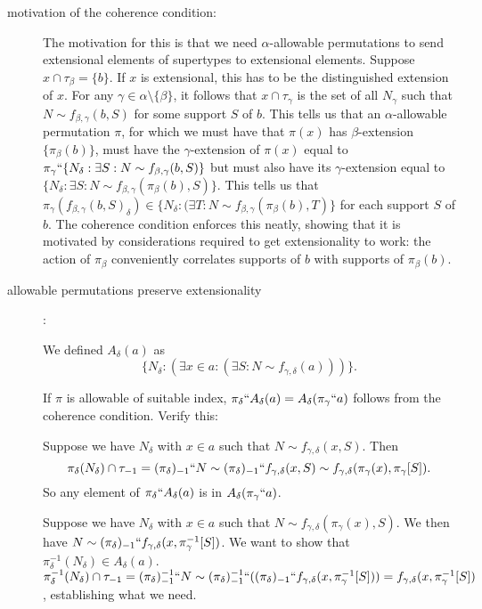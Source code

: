 \documentclass[112pt]{article}
\begin{document}
\begin{description}
\item[motivation of the coherence condition:]  The motivation for this is that we need $\alpha$-allowable permutations to send extensional elements of supertypes to extensional elements.  Suppose
$x \cap \tau_\beta = \{b\}$.  If $x$ is extensional, this has to be the distinguished extension of $x$.  For any $\gamma \in \alpha \setminus \{\beta\}$,
it follows that $x \cap \tau_\gamma$ is the set of all $N_\gamma$ such that $N \sim f_{\beta,\gamma}(b,S)$ for some support $S$ of $b$.  This tells us that an $\alpha$-allowable permutation $\pi$, for which we must have that $\pi(x)$ has $\beta$-extension $\{\pi_\beta(b)\}$, must have the  $\gamma$-extension of $\pi(x)$ equal to $\pi_\gamma``\{N_\delta:\exists S:N \sim f_{\beta,\gamma}(b,S)\}$
but must also have its $\gamma$-extension equal to $\{N_\delta:\exists S:N \sim f_{\beta,\gamma}(\pi_\beta(b),S)\}$.  This tells us that $\pi_\gamma(f_{\beta,\gamma}(b,S)_\delta) \in \{N_\delta:(\exists T:N \sim f_{\beta,\gamma}(\pi_\beta(b),T)\}$ for each support $S$ of $b$.  The coherence condition enforces this neatly, showing that it is motivated by considerations required to get extensionality to work: the action of $\pi_\beta$ conveniently correlates supports of $b$ with supports of $\pi_\beta(b)$.

\item[allowable permutations preserve extensionality]:

  We defined $A_\delta(a)$ as $$\{N_\delta:(\exists x \in a:(\exists S:N \sim f_{\gamma,\delta}(a)))\}.$$

If $\pi$ is allowable of suitable index, $\pi_\delta``A_\delta(a)= A_\delta(\pi_\gamma``a)$ follows from the coherence condition.  Verify this:

Suppose we have $N_\delta$ with $x \in a$ such that $N \sim f_{\gamma,\delta}(x,S)$.  Then $$\pi_\delta(N_\delta)  \cap \tau_{-1} = (\pi_\delta)_{-1}``N \sim (\pi_\delta)_{-1}``f_{\gamma,\delta}(x,S) \sim f_{\gamma,\delta}(\pi_\gamma(x),\pi_\gamma[S]).$$  So any element of $\pi_\delta``A_\delta(a)$ is in $A_\delta(\pi_\gamma``a)$.

Suppose we have $N_\delta$ with $x \in a$ such that $N \sim f_{\gamma,\delta}(\pi_\gamma(x),S)$.  We then have $N \sim (\pi_\delta)_{-1}``f_{\gamma,\delta}(x,\pi_\gamma^{-1}[S])$.  We want to show that $\pi_\delta^{-1}(N_\delta) \in A_\delta(a)$.  $\pi_\delta^{-1}(N_\delta) \cap \tau_{-1} = (\pi_\delta)_{-1}^{-1}``N \sim 
(\pi_\delta)_{-1}^{-1}``((\pi_\delta)_{-1}``f_{\gamma,\delta}(x,\pi_\gamma^{-1}[S])) = f_{\gamma,\delta}(x,\pi_\gamma^{-1}[S])$, establishing what we need.


\end{description}
\end{document}
